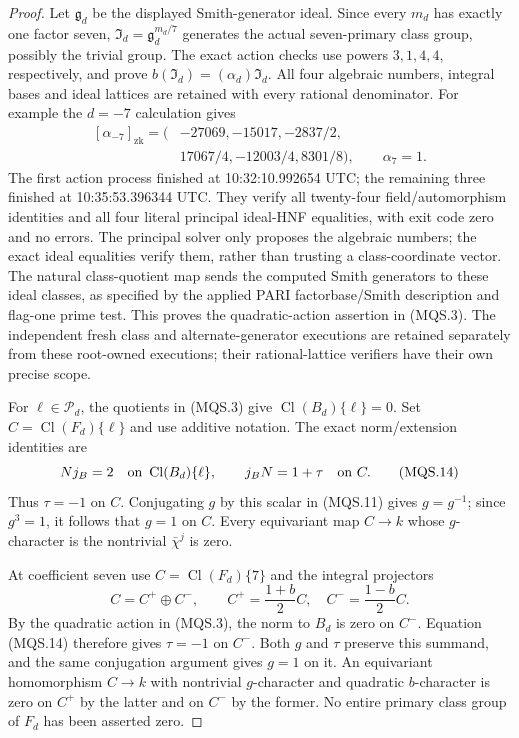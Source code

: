 \begin{proof}
Let $\mathfrak g_d$ be the displayed Smith-generator ideal.
Since every $m_d$ has exactly one factor seven,
$\mathfrak I_d=\mathfrak g_d^{m_d/7}$ generates the actual
seven-primary class group, possibly the trivial group.
The exact action checks use powers $3,1,4,4$, respectively,
and prove $b(\mathfrak I_d)=(\alpha_d)\mathfrak I_d$.
All four algebraic numbers, integral bases and ideal lattices
are retained with every rational denominator.
For example the $d=-7$ calculation gives
\[
 \begin{aligned}
      [\alpha_{-7}]_{\mathrm{zk}}=
        \bigl(&-27069,-15017,-2837/2,\\
              &17067/4,-12003/4,8301/8\bigr),
              \qquad \alpha_7=1.
 \end{aligned}
 \tag{MQS.13}
\]
The first action process finished at 10:32:10.992654 UTC;
the remaining three finished at 10:35:53.396344 UTC.
They verify all twenty-four field/automorphism identities
and all four literal principal ideal-HNF equalities, with
exit code zero and no errors.  The principal solver only
proposes the algebraic numbers; the exact ideal equalities
verify them, rather than trusting a class-coordinate vector.
The natural class-quotient map sends the computed Smith generators
to these ideal classes, as specified by the applied PARI
factorbase/Smith description and flag-one prime test.
This proves the quadratic-action assertion in (MQS.3).
The independent fresh class and alternate-generator executions
are retained separately from these root-owned executions;
their rational-lattice verifiers have their own precise scope.

For $\ell\in\mathscr P_d$, the quotients in (MQS.3) give
$\operatorname{Cl}(B_d)\{\ell\}=0$.
Set $C=\operatorname{Cl}(F_d)\{\ell\}$ and use additive notation.
The exact norm/extension identities are
\[
      N j_B=2\quad\hbox{on }\operatorname{Cl}(B_d)\{\ell\},
      \qquad j_BN=1+\tau\quad\hbox{on }C.
 \tag{MQS.14}
\]
Thus $\tau=-1$ on $C$.  Conjugating $g$ by this scalar in
(MQS.11) gives $g=g^{-1}$; since $g^3=1$, it follows that
$g=1$ on $C$.  Every equivariant map $C\to k$ whose
$g$-character is the nontrivial $\bar\chi^j$ is zero.

At coefficient seven use $C=\operatorname{Cl}(F_d)\{7\}$ and
the integral projectors
\[
             C=C^+\oplus C^-,\qquad
             C^+=\frac{1+b}{2}C,\quad C^-=\frac{1-b}{2}C.
 \tag{MQS.15}
\]
By the quadratic action in (MQS.3), the norm to $B_d$ is zero on $C^-$.
Equation (MQS.14) therefore gives $\tau=-1$ on $C^-$.
Both $g$ and $\tau$ preserve this summand, and the same
conjugation argument gives $g=1$ on it.
An equivariant homomorphism $C\to k$ with nontrivial
$g$-character and quadratic $b$-character is zero on
$C^+$ by the latter and on $C^-$ by the former.
No entire primary class group of $F_d$ has been asserted zero.


\end{proof}
